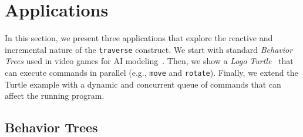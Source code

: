 \documentclass{sig-alternate}
\newcommand{\CEU}{\textsc{C\'{e}u}\xspace}
\newcommand{\code}[1] {{\small{\texttt{#1}}}}
\begin{document}

\section{Applications}

In this section, we present three applications that explore the reactive and 
incremental nature of the \code{traverse} construct.
We start with standard \emph{Behavior Trees} used in video games for AI 
modeling~\cite{isla2005,hecker2009my}.
Then, we show a \emph{Logo Turtle}~\cite{papert.logo} that can execute commands 
in parallel (e.g., \code{move} and \code{rotate}).
Finally, we extend the Turtle example with a dynamic and concurrent queue of 
commands that can affect the running program.

\subsection{Behavior Trees}
\end{document}
